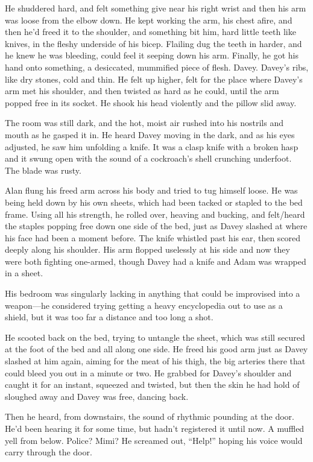 He shuddered hard, and felt something give near his right wrist and
then his arm was loose from the elbow down.  He kept working the arm,
his chest afire, and then he'd freed it to the shoulder, and something
bit him, hard little teeth like knives, in the fleshy underside of his
bicep.  Flailing dug the teeth in harder, and he knew he was bleeding,
could feel it seeping down his arm.  Finally, he got his hand onto
something, a desiccated, mummified piece of flesh.  Davey.  Davey's
ribs, like dry stones, cold and thin.  He felt up higher, felt for the
place where Davey's arm met his shoulder, and then twisted as hard as
he could, until the arm popped free in its socket.  He shook his head
violently and the pillow slid away.

The room was still dark, and the hot, moist air rushed into his
nostrils and mouth as he gasped it in.  He heard Davey moving in the
dark, and as his eyes adjusted, he saw him unfolding a knife.  It was
a clasp knife with a broken hasp and it swung open with the sound of a
cockroach's shell crunching underfoot.  The blade was rusty.

Alan flung his freed arm across his body and tried to tug himself
loose.  He was being held down by his own sheets, which had been
tacked or stapled to the bed frame.  Using all his strength, he rolled
over, heaving and bucking, and felt/heard the staples popping free
down one side of the bed, just as Davey slashed at where his face had
been a moment before.  The knife whistled past his ear, then scored
deeply along his shoulder.  His arm flopped uselessly at his side and
now they were both fighting one-armed, though Davey had a knife and
Adam was wrapped in a sheet.

His bedroom was singularly lacking in anything that could be
improvised into a weapon---he considered trying getting a heavy
encyclopedia out to use as a shield, but it was too far a distance and
too long a shot.

He scooted back on the bed, trying to untangle the sheet, which was
still secured at the foot of the bed and all along one side.  He freed
his good arm just as Davey slashed at him again, aiming for the meat
of his thigh, the big arteries there that could bleed you out in a
minute or two.  He grabbed for Davey's shoulder and caught it for an
instant, squeezed and twisted, but then the skin he had hold of
sloughed away and Davey was free, dancing back.

Then he heard, from downstairs, the sound of rhythmic pounding at the
door.  He'd been hearing it for some time, but hadn't registered it
until now.  A muffled yell from below.  Police?  Mimi?  He screamed
out, ``Help!'' hoping his voice would carry through the door.

